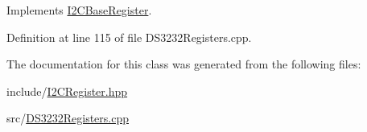 Implements \hyperlink{class_i2_c_base_register_ad3f9f1404fe6af3e10e8f204b16d2066}{I2\+C\+Base\+Register}.



Definition at line 115 of file D\+S3232\+Registers.\+cpp.



The documentation for this class was generated from the following files\+:\begin{DoxyCompactItemize}
\item 
include/\hyperlink{_i2_c_register_8hpp}{I2\+C\+Register.\+hpp}\item 
src/\hyperlink{_d_s3232_registers_8cpp}{D\+S3232\+Registers.\+cpp}\end{DoxyCompactItemize}
